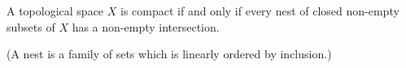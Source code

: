 A topological space $X$ is compact if and only if every nest of closed non-empty subsets of $X$ has a non-empty intersection.

(A nest is a family of sets which is linearly ordered by inclusion.)
